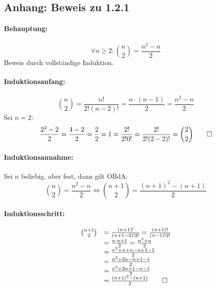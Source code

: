 \documentclass{article}
\begin{document}
\subsection*{Anhang: Beweis zu 1.2.1}
\paragraph{Behauptung:}
	\[
		\forall n \geq 2: \binom{n}{2} = \frac{n^2-n}{2}
	\]
Beweis durch vollständige Induktion.
\paragraph{Induktionsanfang:}
	\[
		\binom{n}{2}=\frac{n!}{2!(n-2)!}=\frac{n\cdot(n-1)}{2}=\frac{n^2-n}{2}
	\]
Sei $n=2$:
	\[
		\frac{2^2-2}{2}=\frac{4-2}{2}=\frac{2}{2}=1=\frac{2!}{2!0!}=\frac{2!}{2!(2-2)!}=\binom{2}{2} \qed
	\]
\paragraph{Induktionsannahme:}
Sei $n$ beliebig, aber fest, dann gilt OBdA:
	\[
		\binom{n}{2}=\frac{n^2-n}{2} \Leftrightarrow \binom{n+1}{2} = \frac{(n+1)^2-(n+1)}{2}
	\]
\paragraph{Induktionsschritt:}
	\begin{equation*}
		\begin{array}{ll}
			\binom{n+1}{2}&=\frac{(n+1)!}{(n+1-2)!2!}=\frac{(n+1)!}{(n-1)!2!}\\
							&=\frac{n \cdot n + 1}{2} = \frac{n^2+n}{2}\\
							&=\frac{n^2+n+n-n+1-1}{2}\\
							&=\frac{n^2+2n-n+1-1}{2}\\
							&=\frac{n^2+2n+1-n-1}{2}\\
							&=\frac{(n+1)^2-(n+1)}{2}\qed
		\end{array}
	\end{equation*}
\end{document}
